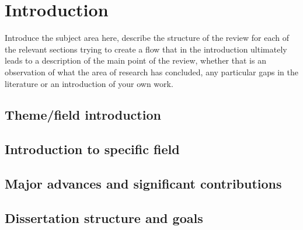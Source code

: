 \documentclass[../main.tex]{subfiles}
\begin{document}
\chapter{Introduction}
\minitoc \mtcskip 
Introduce the subject area here, describe the structure of the review for each of the relevant sections trying to create a flow that in the introduction ultimately leads to a description of the main point of the review, whether that is an observation of what the area of research has concluded, any particular gaps in the literature or an introduction of your own work.

\section{Theme/field introduction}
\section{Introduction to specific field}
\section{Major advances and significant contributions}
\section{Dissertation structure and goals}
\end{document}
